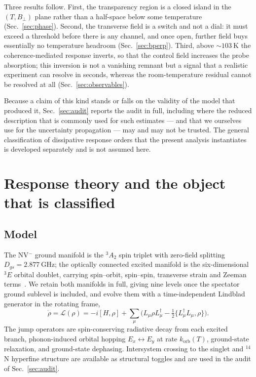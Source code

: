 \documentclass[
  reprint,
  amsmath,amssymb,
  aps,pra,
  superscriptaddress,
  floatfix,
]{revtex4-2}
\newcommand{\Bperp}{B_{\perp}}
\begin{document}
Three results follow. First, the transparency region is a closed island in
the $(T,\Bperp)$ plane rather than a half-space below some temperature
(Sec.~\ref{sec:phase}). Second, the transverse field is a switch and not a
dial: it must exceed a threshold before there is any channel, and once open,
further field buys essentially no temperature headroom
(Sec.~\ref{sec:bperp}). Third, above $\sim\!\SI{103}{\kelvin}$ the
coherence-mediated response inverts, so that the control field increases the
probe absorption; this inversion is not a vanishing remnant but a signal that
a realistic experiment can resolve in seconds, whereas the room-temperature
residual cannot be resolved at all (Sec.~\ref{sec:observables}).

Because a claim of this kind stands or falls on the validity of the model that
produced it, Sec.~\ref{sec:audit} reports the audit in full, including where
the reduced description that is commonly used for such estimates --- and that
we ourselves use for the uncertainty propagation --- may and may not be
trusted. The general classification of dissipative response orders that the
present analysis instantiates is developed separately and is not assumed here.

\section{Response theory and the object that is classified}
\label{sec:theory}

\subsection{Model}

The NV$^{-}$ ground manifold is the $^{3}A_{2}$ spin triplet with
zero-field splitting $D_{gs}=\SI{2.877}{\giga\hertz}$; the optically
connected excited manifold is the six-dimensional $^{3}E$ orbital doublet,
carrying spin--orbit, spin--spin, transverse strain and Zeeman
terms~\cite{A2009S03,G2017S08}. We retain both manifolds in full, giving nine
levels once the spectator ground sublevel is included, and evolve them with a
time-independent Lindblad generator in the rotating frame,
%
\begin{equation}
\dot\rho=\mathcal{L}(\rho)
=-i[H,\rho]+\sum_{\mu}\Big(L_{\mu}\rho L_{\mu}^{\dagger}
-\tfrac12\{L_{\mu}^{\dagger}L_{\mu},\rho\}\Big).
\label{eq:gksl}
\end{equation}
%
The jump operators are spin-conserving radiative decay from each excited
branch, phonon-induced orbital hopping $E_{x}\!\leftrightarrow\!E_{y}$ at rate
$k_{\mathrm{orb}}(T)$, ground-state relaxation, and ground-state dephasing.
Intersystem crossing to the singlet and $^{14}$N hyperfine structure are
available as structural toggles and are used in the audit of
Sec.~\ref{sec:audit}.
\end{document}
